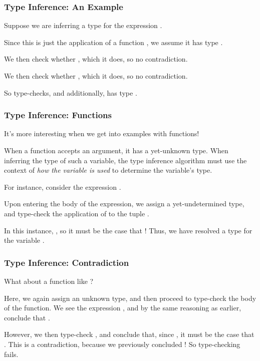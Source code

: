 \documentclass[aspectratio=169]{beamer}
\begin{document}
\begin{frame}[fragile]
  \frametitle{Type Inference: An Example}

  Suppose we are inferring a type for the expression .

  Since this is just the application of a function ,
  we assume it has type .
  
  We then check whether , which it does, so no contradiction.
  
  We then check whether , which it does, so no contradiction.

  So  type-checks, and additionally, has type .
\end{frame}

\begin{frame}[fragile]
  \frametitle{Type Inference: Functions}

  It's more interesting when we get into examples with functions!

  When a function accepts an argument, it has a yet-unknown type. When
  inferring the type of such a variable, the type inference algorithm must
  use the context of \textit{how the variable is used} to determine the
  variable's type.

  For instance, consider the expression .

  Upon entering the body of the expression, we assign  a yet-undetermined
  type, and type-check the application of \code{+} to the tuple .

  In this instance, , so it must be the case that
  ! Thus, we have resolved a type for the variable .
\end{frame}

\begin{frame}[fragile]
  \frametitle{Type Inference: Contradiction}

  What about a function like ?

  Here, we again assign  an unknown type, and then proceed
  to type-check the body of the function. We see the expression 
  , and by the same reasoning as earlier, conclude that
  .

  However, we then type-check , and conclude that,
  since , it must be the case
  that . This is a contradiction, because we 
  previously concluded ! So type-checking fails.
\end{frame}
\end{document}
